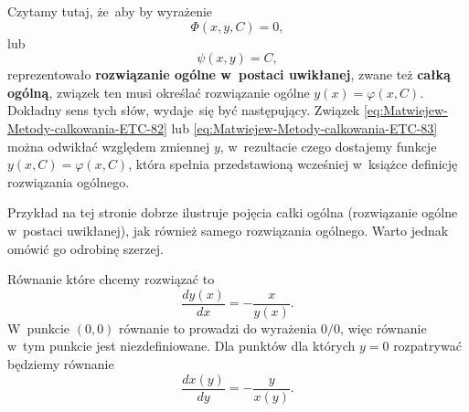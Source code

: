 \documentclass[a4paper,11pt]{article}
\numberwithin{equation}{section}
\begin{document}
\VerSpaceFour





\noindent
Czytamy tutaj, że~aby by wyrażenie
\begin{equation}
  \label{eq:Matwiejew-Metody-calkowania-ETC-82}
  \Phi( x, y, C ) = 0,
\end{equation}
lub
\begin{equation}
  \label{eq:Matwiejew-Metody-calkowania-ETC-83}
  \psi( x, y ) = C,
\end{equation}
reprezentowało \textbf{rozwiązanie ogólne w~postaci uwikłanej}, zwane też
\textbf{całką ogólną}, związek ten musi określać rozwiązanie ogólne
$y( x ) = \varphi( x, C )$. Dokładny sens tych słów, wydaje~się być następujący.
Związek \eqref{eq:Matwiejew-Metody-calkowania-ETC-82} lub
\eqref{eq:Matwiejew-Metody-calkowania-ETC-83} można odwikłać względem
zmiennej $y$, w~rezultacie czego dostajemy funkcje $y( x, C ) = \varphi( x, C )$,
która spełnia przedstawioną wcześniej w~książce definicję rozwiązania
ogólnego.

\VerSpaceFour





\noindent
{} Przykład na tej stronie dobrze ilustruje pojęcia całki ogólna
(rozwiązanie ogólne w~postaci uwikłanej), jak również samego rozwiązania
ogólnego. Warto jednak omówić go odrobinę szerzej.

Równanie które chcemy rozwiązać to
\begin{equation}
  \label{eq:Matwiejew-Metody-calkowania-ETC-84}
  \frac{ d y( x ) }{ d x } = -\frac{ x }{ y( x ) }.
\end{equation}
W~punkcie $( 0, 0 )$ równanie to prowadzi do wyrażenia $0 / 0$, więc
równanie w~tym punkcie jest niezdefiniowane. Dla punktów dla których
$y = 0$ rozpatrywać będziemy równanie
\begin{equation}
  \label{eq:Matwiejew-Metody-calkowania-ETC-85}
  \frac{ d x( y ) }{ d y } = -\frac{ y }{ x( y ) }.
\end{equation}
\end{document}
